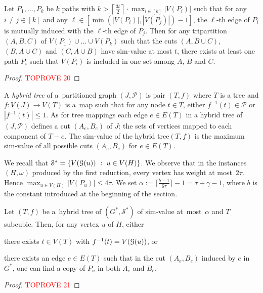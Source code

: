 \documentclass[a4paper,UKenglish,cleveref,hyperref,autoref]{lipics-v2021}
\renewcommand{\leq}{\leqslant}
\renewcommand{\le}{\leq}
\newcommand{\weight}{\omega}
\newcommand{\tmaps}{tree mappings\xspace}
\newcommand{\htree}{hybrid tree\xspace}
\begin{document}
\begin{lemma}\label{lem:tricut-doesnt-cut}
Let $P_1, \dots, P_k$ be $k$ paths with $k > \left \lceil \frac{3t}{2} \right \rceil \cdot \max_{i \in [k]} |V(P_i)|$ such that for any $i \neq j \in [k]$ and any $\ell \in [\min(|V(P_i)|,|V(P_j)|)-1]$, the $\ell$-th edge of $P_i$ is mutually induced with the $\ell$-th edge of $P_j$.
Then for any tripartition $(A, B, C)$ of $V(P_1) \cup \ldots \cup V(P_k)$ such that the cuts $(A,B \cup C)$, $(B,A \cup C)$ and $(C, A \cup B)$ have sim-value at most $t$, there exists at least one path $P_i$ such that $V(P_i)$ is included in one set among $A$, $B$ and $C$.
\end{lemma}
\begin{proof}\textcolor{red}{TOPROVE 20}\end{proof}

A \emph{\htree} of a~partitioned graph $(J, \mathcal P)$ is pair $(T, f)$ where $T$ is a tree and $f \colon V(J) \rightarrow V(T)$ is a~map such that for any node $t \in T$, either $f^{-1}(t) \in \mathcal P$ or $|f^{-1}(t)| \le 1$.
As for \tmaps each edge $e \in E(T)$ in a \htree of $(J, \mathcal P)$ defines a cut $(A_e, B_e)$ of $J$: the sets of vertices mapped to each component of $T-e$.
The sim-value of the \htree $(T, f)$ is the maximum sim-value of all possible cuts $(A_e, B_e)$ for $e \in E(T)$.

We recall that $\mathcal S^* = \{V(\mathcal G(u))~:~u \in V(H)\}$.
We observe that in the instances $(H,\weight)$ produced by the first reduction, every vertex has weight at most~$2 \tau$.
Hence $\max_{u \in V(H)} |V(P_u)| \leq 4 \tau$.
We set $\alpha := \lceil \frac{b-1}{6 \tau} \rceil - 1 = \tau + \gamma - 1$, where $b$ is the constant introduced at the beginning of the section.

\begin{lemma}\label{lem:default-edge}
Let $(T, f)$ be a~\htree of $(G^*, \mathcal S^*)$ of sim-value at~most~$\alpha$ and $T$ subcubic.
Then, for any vertex $u$ of $H$, either
\begin{compactitem}
\item there exists $t \in V(T)$ with $f^{-1}(t) = V(\mathcal G(u))$, or
\item there exists an edge $e \in E(T)$ such that in the cut $(A_e, B_e)$ induced by $e$ in $G^*$, one can find a copy of $P_u$ in both $A_e$ and $B_e$.
\end{compactitem}
\end{lemma}

\begin{proof}\textcolor{red}{TOPROVE 21}\end{proof}
\end{document}
